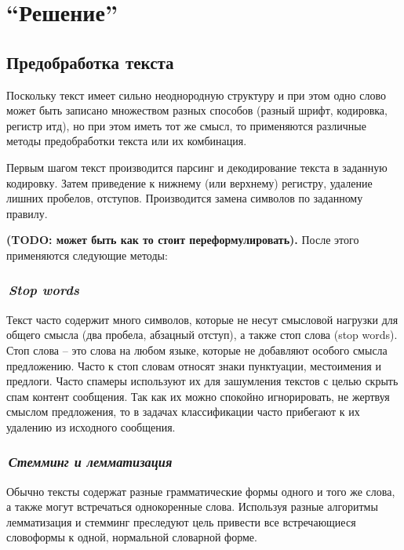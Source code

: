 \documentclass[12pt]{article}
\begin{document}
\section{``Решение''}
\subsection*{Предобработка текста}
Поскольку текст имеет сильно неоднородную структуру и при этом одно слово может быть записано множеством разных способов (разный шрифт, кодировка, регистр итд), но при этом иметь тот же смысл, то применяются различные методы предобработки текста или их комбинация.

Первым шагом текст производится парсинг и декодирование текста в заданную кодировку. Затем приведение к нижнему (или верхнему) регистру, удаление лишних пробелов, отступов. Производится замена символов по заданному правилу.

{\bf\color{amaranth} (TODO: может быть как то стоит переформулировать).}
После этого применяются следующие методы:

\subsubsection*{\it\,Stop words}
Текст часто содержит много символов, которые не несут смысловой нагрузки для общего смысла (два пробела, абзацный отступ), а также стоп слова (stop words).
Стоп слова -- это слова на любом языке, которые не добавляют особого смысла предложению. 	Часто к стоп словам относят знаки пунктуации, местоимения и предлоги. Часто спамеры используют их для зашумления текстов с целью скрыть спам контент сообщения. Так как их можно спокойно игнорировать, не жертвуя смыслом предложения, то в задачах классификации часто прибегают к их удалению из исходного сообщения.

\subsubsection*{\it\,Стемминг и лемматизация}
Обычно тексты содержат разные грамматические формы одного и того же слова, а также могут встречаться однокоренные слова. Используя разные алгоритмы лемматизация и стемминг преследуют цель привести все встречающиеся словоформы к одной, нормальной словарной форме.
\end{document}
